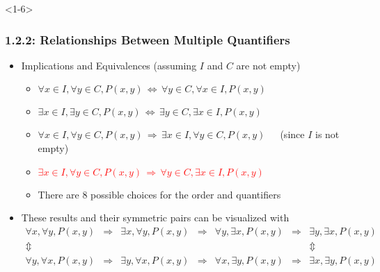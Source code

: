 \documentclass[10pt,english,aspectratio=169]{beamer}
\begin{document}
\begin{frame}<1-6> \frametitle{1.2.2: Relationships Between Multiple Quantifiers}

\begin{itemize}
\setlength\itemsep{5mm}
\item<1-> Implications and Equivalences (assuming $I$ and $C$ are not empty) \vspace{1mm}
\begin{itemize}
 \setlength\itemsep{1.5mm}
 \item<1-> $\forall x\!\in\! I, \forall y\!\in\! C, P(x,y)  \,\Leftrightarrow\, \forall y\!\in\! C, \forall x\!\in\! I, P(x,y)$
 \item<2-> $\exists x\!\in\! I, \exists y\!\in\! C, P(x,y) \,\Leftrightarrow\, \exists y\!\in\! C, \exists x\!\in\! I, P(x,y)$
 \item<3-> $\forall x\!\in\! I, \forall y\!\in\! C, P(x,y) \,\Rightarrow\, \exists x\!\in\! I, \forall y\!\in\! C, P(x,y)$~~~(since $I$ is not empty)
 \item<4-> \textcolor{red}{$\exists x\!\in\! I, \forall y\!\in\! C, P(x,y) \,\Rightarrow\, \forall y\!\in\! C, \exists x\!\in\! I, P(x,y)$}
 \item<5-> There are 8 possible choices for the order and quantifiers
    
\end{itemize}

 \item<6-> These results and their symmetric pairs can be visualized with \\[-3mm] {\small \color{blue} \[ \begin{array}{ccccccc}
   \forall x, \forall y, P(x,y) & \Rightarrow & \exists x, \forall y, P(x,y) & \Rightarrow & \forall y, \exists x, P(x,y) & \Rightarrow & \exists y, \exists x, P(x,y) \\
   \Updownarrow &&&&&& \Updownarrow \\
   \forall y, \forall x, P(x,y) & \Rightarrow & \exists y, \forall x, P(x,y) & \Rightarrow & \forall x, \exists y, P(x,y) & \Rightarrow & \exists x, \exists y, P(x,y)
   \end{array} \]}

\end{itemize}



\end{frame}
\end{document}
